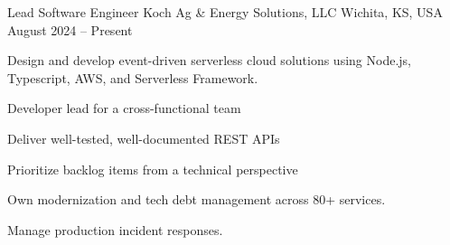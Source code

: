 
\begin{cventries}

	\cventry
	{Lead Software Engineer} %
	{Koch Ag \& Energy Solutions, LLC} %
	{Wichita, KS, USA} %
	{August 2024 -- Present} %
	{
		\begin{cvitems}
			\item Design and develop event-driven serverless cloud solutions using
			Node.js, Typescript, AWS, and Serverless Framework.
			\item Developer lead for a cross-functional team
			\item Deliver well-tested, well-documented REST APIs
			\item Prioritize backlog items from a technical perspective
			\item Own modernization and tech debt management across 80+ services.
			\item Manage production incident responses.
		\end{cvitems}
	}


\end{cventries}
